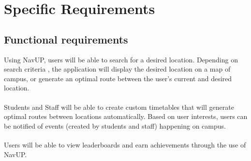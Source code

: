 \documentclass[12pt]{article}
\begin{document}
	\section{Specific Requirements}
	\subsection{Functional requirements}

	Using NavUP, users will be able to search for a desired location. Depending on search criteria , the application will display the desired location on a map of campus, or generate an optimal route between the user's current and desired location. \\\\
	Students and Staff will be able to create custom timetables that will generate optimal routes between locations automatically.
	Based on user interests, users can be notified of events (created by students and staff) happening on campus. \\\\
	Users will be able to view leaderboards and earn achievements through the use of NavUP. 
\end{document}

